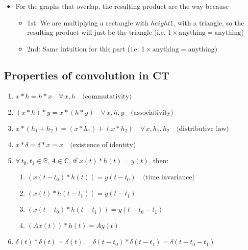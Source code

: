 \begin{example}
\end{example}

\begin{example}
    \begin{itemize}
        \item For the graphs that overlap, the resulting product are the way because
        \begin{itemize}
            \item 1st: We are multiplying a rectangle with $height 1$, with a triangle, so the resulting product will just be the triangle (i.e. $1 \times \text{anything} = \text{anything}$)
            \item 2nd: Same intuition for this part (i.e. $1 \times \text{anything} = \text{anything}$)
        \end{itemize}
    \end{itemize}
\end{example}

\subsection{Properties of convolution in CT}
\begin{definition}
    \begin{enumerate}
        \item \( x * h = h * x \quad \forall \, x,h \quad \text{(commutativity)} \)
        
        \item \( (x * h) * y = x * (h * y) \quad \forall \, x,h,y \quad \text{(associativity)} \)
        
        \item \( x * (h_1 + h_2) = (x * h_1) + (x * h_2) \quad \forall \, x,h_1,h_2 \quad \text{(distributive law)} \)
        
        \item \( x * \delta = \delta * x = x \quad \text{(existence of identity)} \)
        
        \item \( \forall \, t_0, t_1 \in \mathbb{R}, A \in \mathbb{C} \), if \( x(t) * h(t) = y(t) \), then:
        \begin{enumerate}
            \item \( (x(t - t_0) * h(t)) = y(t - t_0) \quad \text{(time invariance)} \)
            \item \( (x(t) * h(t - t_1)) = y(t - t_1) \)
            \item \( (x(t - t_0) * h(t - t_1)) = y(t - t_0 - t_1) \)
            \item \( (Ax(t)) * h(t) = Ay(t) \)
        \end{enumerate}
        
        \item \( \delta(t) * \delta(t) = \delta(t), \quad \delta(t - t_0) * \delta(t - t_1) = \delta(t - t_0 - t_1) \)
    \end{enumerate}
\end{definition}

